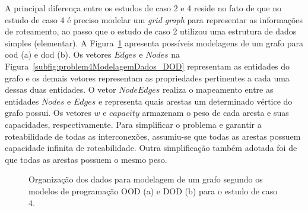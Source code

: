 A principal diferença entre os estudos de caso 2 e 4 reside no fato de que no estudo de caso 4 é preciso modelar um \textit{grid graph} para representar as informações de roteamento, ao passo que o estudo de caso 2 utilizou uma estrutura de dados simples (elementar).
A Figura~\ref{fig:problem4ModelagemDados} apresenta possíveis modelagens de um grafo para \ac{ood} (a) e \ac{dod} (b).
Os vetores $Edges$ e $Nodes$ na Figura~\ref{subfig:problem4ModelagemDados_DOD} representam as entidades do grafo e os demais vetores representam as propriedades pertinentes a cada uma dessas duas entidades. O vetor $Node Edges$ realiza o mapeamento entre as entidades $Nodes$ e $Edges$ e representa quais arestas um determinado vértice do grafo possui.
Os vetores $w$ e $capacity$ armazenam o peso de cada aresta e suas capacidades, respectivamente.
Para simplificar o problema e garantir a roteabilidade de todas as interconexões, assumiu-se que todas as arestas possuem capacidade infinita de roteabilidade.
Outra simplificação também adotada foi de que todas as arestas possuem o mesmo peso.


\begin{figure}[h!b]
    \centering
    \caption[Organização dos dados estudo de caso 4]{Organização dos dados para modelagem de um grafo segundo os modelos de programação OOD (a) e DOD (b) para o estudo de caso 4.}
    \label{fig:problem4ModelagemDados}
\end{figure}

